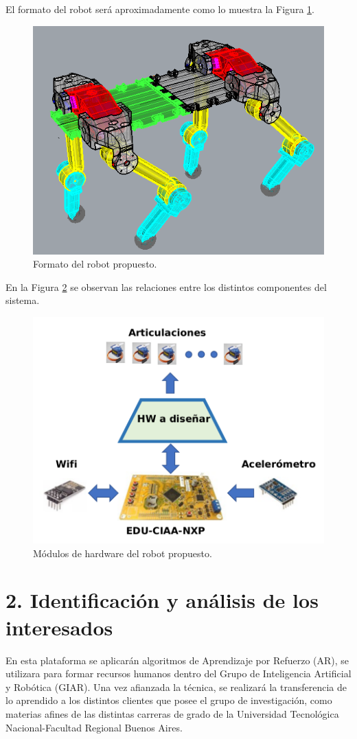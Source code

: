 \documentclass[
11pt, %
codirector, %
]{charter}
\begin{document}
El formato del robot será aproximadamente como lo muestra la Figura \ref{fig:robotTetrapodo}.
\begin{figure}[htpb]
\centering 
\includegraphics[width=.6\textwidth]{./Figuras/tetratopo.png}
\caption{Formato del robot propuesto.}
\label{fig:robotTetrapodo}
\end{figure}

En la Figura \ref{fig:robotDiagrama} se observan las relaciones entre los distintos componentes del sistema.

\begin{figure}[htpb]
\centering 
\includegraphics[width=.8\textwidth]{./Figuras/tetra.png}
\caption{Módulos de hardware del robot propuesto.}
\label{fig:robotDiagrama}
\end{figure}


\section{2. Identificación y análisis de los interesados}
\label{sec:interesados}

En esta plataforma se aplicarán algoritmos de Aprendizaje por Refuerzo (AR), se utilizara para formar recursos humanos dentro del Grupo de Inteligencia Artificial y Robótica (GIAR). Una vez afianzada la técnica, se realizará la transferencia de lo aprendido a los distintos clientes que posee el grupo de investigación, como materias afines de las distintas carreras de grado de la Universidad Tecnológica Nacional-Facultad Regional Buenos Aires.
\end{document}

